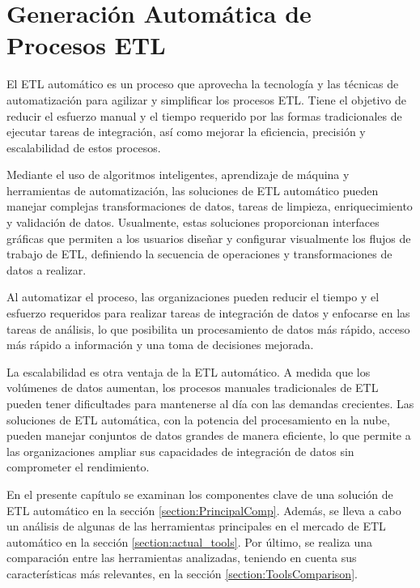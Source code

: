 \chapter{Generaci\'on Autom\'atica de Procesos ETL}\label{chapter:auto-etl}

El ETL automático es un proceso que 
aprovecha la tecnología y las técnicas de automatización para agilizar y simplificar los procesos ETL. Tiene el objetivo 
de reducir el esfuerzo manual y el tiempo requerido por las formas tradicionales de ejecutar tareas de integración, 
as\'i como mejorar la eficiencia, precisión y escalabilidad de estos procesos.

Mediante el uso de algoritmos inteligentes, aprendizaje de m\'aquina y herramientas de automatización, las soluciones de 
ETL automático pueden manejar complejas transformaciones de datos, tareas de limpieza, enriquecimiento 
y validación de datos. Usualmente, estas soluciones proporcionan interfaces gráficas que permiten a los 
usuarios diseñar y configurar visualmente los flujos de trabajo de ETL, definiendo la secuencia de operaciones y 
transformaciones de datos a realizar.

Al automatizar el proceso, las 
organizaciones pueden reducir el tiempo y el esfuerzo requeridos para realizar tareas de integración de 
datos y enfocarse en las tareas de an\'alisis, lo que posibilita un procesamiento de datos más rápido, acceso más rápido 
a información y una toma de decisiones mejorada.

La escalabilidad es otra ventaja de la ETL automático. A medida que los volúmenes de datos aumentan, los procesos manuales 
tradicionales de ETL pueden tener dificultades para mantenerse al día con las demandas crecientes. Las soluciones de ETL 
automática, con la potencia del procesamiento en la nube, pueden manejar conjuntos de datos grandes de manera eficiente, 
lo que permite a las organizaciones ampliar sus capacidades de integración de datos sin comprometer el rendimiento.

En el presente cap\'itulo se examinan los componentes clave de una solución de ETL automático en la sección 
\ref{section:PrincipalComp}. Además, se lleva a cabo un análisis de algunas de las herramientas principales en el 
mercado de ETL automático en la sección \ref{section:actual_tools}. Por último, se realiza una comparación entre las 
herramientas analizadas, teniendo en cuenta sus características más relevantes, en la sección 
\ref{section:ToolsComparison}. 




